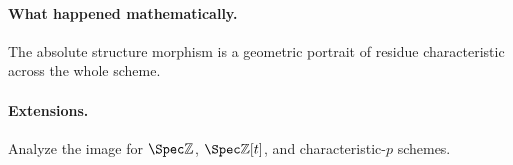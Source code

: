 \paragraph{What happened mathematically.}
The absolute structure morphism is a geometric portrait of residue characteristic across the whole scheme.

\paragraph{Extensions.}
Analyze the image for $\Spec\mathbb Z$, $\Spec\mathbb Z[t]$, and characteristic-$p$ schemes.
\fi
